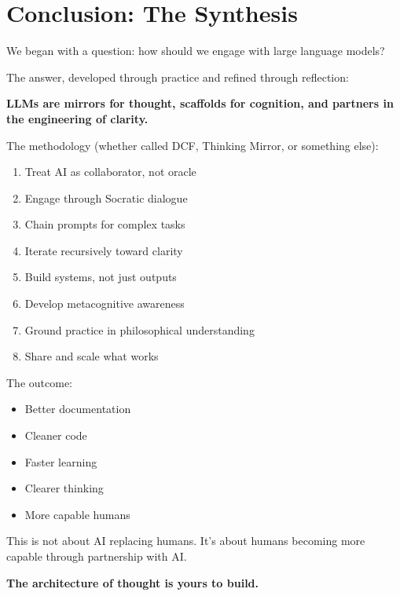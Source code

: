 \chapter*{Conclusion: The Synthesis}

We began with a question: how should we engage with large language models?

The answer, developed through practice and refined through reflection:

\begin{quotebox}
\textbf{LLMs are mirrors for thought, scaffolds for cognition, and partners in the engineering of clarity.}
\end{quotebox}

The methodology (whether called DCF, Thinking Mirror, or something else):

\begin{enumerate}
    \item Treat AI as collaborator, not oracle
    \item Engage through Socratic dialogue
    \item Chain prompts for complex tasks
    \item Iterate recursively toward clarity
    \item Build systems, not just outputs
    \item Develop metacognitive awareness
    \item Ground practice in philosophical understanding
    \item Share and scale what works
\end{enumerate}

The outcome:
\begin{itemize}
    \item Better documentation
    \item Cleaner code
    \item Faster learning
    \item Clearer thinking
    \item More capable humans
\end{itemize}

This is not about AI replacing humans. It's about humans becoming more capable through partnership with AI.

\begin{center}
\textbf{The architecture of thought is yours to build.}
\end{center}


\appendix

